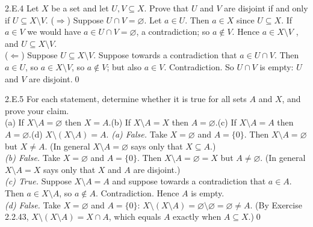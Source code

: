 \begin{bookex}[recommended]{2.E.4}
Let $X$ be a set and let $U,V\subseteq X$. Prove that $U$ and $V$ are disjoint if and only if $U\subseteq X\setminus V$.
\solution
($\Rightarrow$) Suppose $U\cap V=\varnothing$. Let $a\in U$. Then $a\in X$ since $U\subseteq X$. If $a\in V$ we would have $a\in U\cap V=\varnothing$, a contradiction; so $a\notin V$. Hence $a\in X\setminus V$ , and $U\subseteq X\setminus V$.\\
($\Leftarrow$) Suppose $U\subseteq X\setminus V$. Suppose towards a contradiction that $a\in U\cap V$. Then $a\in U$, so $a\in X\setminus V$, so $a\notin V$; but also $a\in V$. Contradiction. So $U\cap V$ is empty: $U$ and $V$ are disjoint.\qed
\end{bookex}

\begin{bookex}[recommended]{2.E.5}
For each statement, determine whether it is true for all sets $A$ and $X$, and prove your claim.\\
(a) If $X\setminus A=\varnothing$ then $X=A$.\quad (b) If $X\setminus A=X$ then $A=\varnothing$.\quad (c) If $X\setminus A=A$ then $A=\varnothing$.\quad (d) $X\setminus(X\setminus A)=A$.
\solution
\emph{(a) False.} Take $X=\varnothing$ and $A=\{0\}$. Then $X\setminus A=\varnothing$ but $X\ne A$. (In general $X\setminus A=\varnothing$ says only that $X\subseteq A$.)\\
\emph{(b) False.} Take $X=\varnothing$ and $A=\{0\}$. Then $X\setminus A=\varnothing=X$ but $A\ne\varnothing$. (In general $X\setminus A=X$ says only that $X$ and $A$ are disjoint.)\\
\emph{(c) True.} Suppose $X\setminus A=A$ and suppose towards a contradiction that $a\in A$. Then $a\in X\setminus A$, so $a\notin A$. Contradiction. Hence $A$ is empty.\\
\emph{(d) False.} Take $X=\varnothing$ and $A=\{0\}$: $X\setminus(X\setminus A)=\varnothing\setminus\varnothing=\varnothing\ne A$. (By Exercise 2.2.43, $X\setminus(X\setminus A)=X\cap A$, which equals $A$ exactly when $A\subseteq X$.)\qed
\end{bookex}

